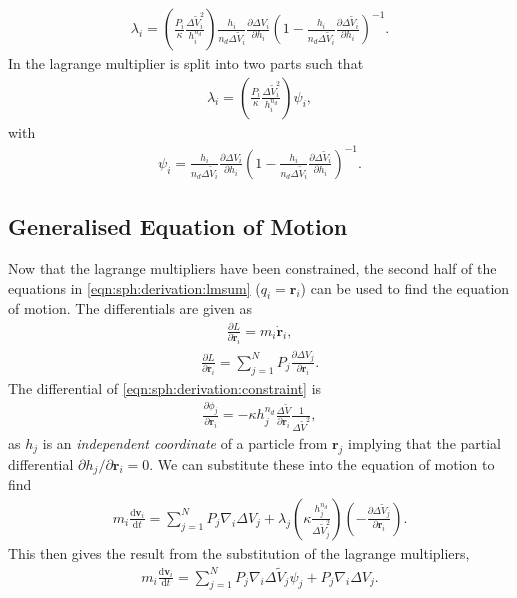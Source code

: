\begin{align}
  \lambda_i =
  \left(\frac{P_i}{\kappa} \frac{\Delta \tilde{V}^2_i}{h^{n_d}_i}\right)
    \frac{h_i}{n_d \Delta \tilde{V}_i}
    \frac{\partial \Delta V_i}{\partial h_i}
  \left(1 - \frac{h_i}{n_d \Delta \tilde{V}_i}
    \frac{\partial \Delta \tilde{V}_i}{\partial h_i}
  \right)^{-1}.
\end{align}
In \citet{hopkins2013} the lagrange multiplier is split into two parts such that
\begin{align}
    \lambda_i =
    \left(\frac{P_i}{\kappa}
      \frac{\Delta \tilde{V}^2_i}{h^{n_d}_i}
    \right)\psi_i,
   \label{eqn:sph:derivation:lambda_i}
\end{align}
with
\begin{align}
  \psi_i =
    \frac{h_i}{n_d \Delta \tilde{V}_i}
    \frac{\partial \Delta V_i}{\partial h_i}
    \left(1 - \frac{h_i}{n_d \Delta \tilde{V}_i}
      \frac{\partial \Delta \tilde{V}_i}{\partial h_i}
    \right)^{-1}.
  \label{eqn:sph:derivation:psi_I}
\end{align}

\subsection{Generalised Equation of Motion}

Now that the lagrange multipliers have been constrained, the second half of the
equations in \ref{eqn:sph:derivation:lmsum} ($q_i = \mathbf{r}_i$) can be used
to find the equation of motion. The differentials are given as
\begin{align}
    \frac{\partial L}{\partial \dot{\mathbf{r}}_i} = m_i \dot{\mathbf{r}}_i,
\end{align}
\begin{align}
    \frac{\partial L}{\partial \mathbf{r}_i} =
      \sum_{j=1}^N P_j \frac{\partial \Delta V_j}{\partial \mathbf{r}_i}.
\end{align}
The differential of \ref{eqn:sph:derivation:constraint} is
\begin{align}
    \frac{\partial \phi_j}{\partial \mathbf{r}_i} =
      - \kappa h_j^{n_d} \frac{\Delta \tilde{V}}{\partial \mathbf{r}_i}
        \frac{1}{\Delta \tilde{V}^2},
\end{align}
as $h_j$ is an \emph{independent coordinate} of a particle from $\mathbf{r}_j$
implying that the partial differential $\partial h_j/\partial \mathbf{r}_i = 0$.
We can substitute these into the equation of motion to find
\begin{align}
  m_i \frac{\mathrm{d} \mathbf{v}_i}{\mathrm{d}t} =  
    \sum^N_{j=1}  P_j \nabla_i \Delta V_j + \lambda_j
      \left(
        \kappa \frac{h_j^{n_d}}{\Delta \tilde{V}_j^2}
      \right)
      \left(
        - \frac{\partial \Delta \tilde{V}_j}{\partial \mathbf{r}_i}
      \right).
\end{align}
This then gives the result from the substitution of the lagrange multipliers, 
\begin{align}
  m_i \frac{\mathrm{d} \mathbf{v}_i}{\mathrm{d}t} =
  \sum^N_{j=1} P_j \nabla_i \Delta \tilde{V}_j \psi_j +
  P_j \nabla_i \Delta V_j.
  \label{eqn:sph:derivation:eom}
\end{align}

